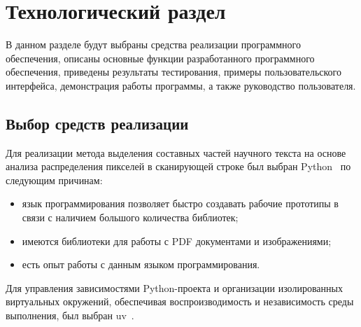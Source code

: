\section{Технологический раздел}

В данном разделе будут выбраны средства реализации программного обеспечения, описаны основные функции разработанного программного обеспечения, приведены результаты тестирования, примеры пользовательского интерфейса, демонстрация работы программы, а также руководство пользователя.



\subsection{Выбор средств реализации}


Для реализации метода выделения составных частей научного текста на основе анализа распределения пикселей в сканирующей строке был выбран Python~\cite{python} по следующим причинам:
\begin{itemize}
    \item язык программирования позволяет быстро создавать рабочие прототипы в связи с наличием большого количества библиотек;
    \item имеются библиотеки для работы с PDF документами и изображениями;
    \item есть опыт работы с данным языком программирования.
\end{itemize}

Для управления зависимостями Python-проекта и организации изолированных виртуальных окружений, обеспечивая воспроизводимость и независимость среды выполнения, был выбран uv~\cite{uv}.

